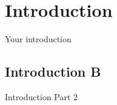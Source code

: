 \documentclass[12pt]{article}
\begin{document}
\tableofcontents

\section{Introduction}

Your introduction 

\subsection{Introduction B}

Introduction Part 2
\end{document}
